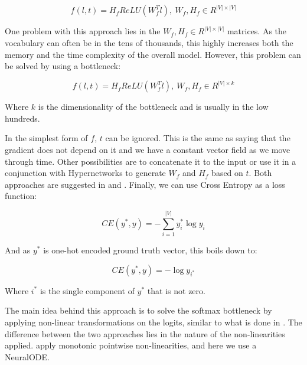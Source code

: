 \begin{displaymath}
    f(l, t) = H_f ReLU(W_f^T l), \ W_f, H_f \in R^{|V| \times |V|}    
\end{displaymath}

One problem with this approach lies in the $ W_f, H_f \in R^{ |V| \times |V| } $ matrices. As the vocabulary can often be in the tens of thousands, this highly increases both the memory and the time complexity of the overall model. However, this problem can be solved by using a bottleneck:

\begin{displaymath}
    f(l, t) = H_f ReLU(W_f^T l), \ W_f, H_f \in R^{|V| \times k}    
\end{displaymath}

Where $ k $ is the dimensionality of the bottleneck and is usually in the low hundreds.

In the simplest form of $ f $, $ t $ can be ignored. This is the same as saying that the gradient does not depend on it and we have a constant vector field as we move through time. Other possibilities are to concatenate it to the input or use it in a conjunction with Hypernetworks \citep{ha2016hypernetworks} to generate $ W_f $ and $ H_f $ based on $ t $. Both approaches are suggested in \citet{chen2018neural} and \citet{grathwohl2018ffjord}. Finally, we can use Cross Entropy as a loss function:

\begin{displaymath}
    CE(y^*, y) = - \sum_{i=1}^{|V|} y^*_i \log y_i
\end{displaymath}

And as $ y^* $ is one-hot encoded ground truth vector, this boils down to:

\begin{displaymath}
    CE(y^*, y) = - \log y_{i^*}
\end{displaymath}

Where $ i^* $ is the single component of $ y^* $ that is not zero.

The main idea behind this approach is to solve the softmax bottleneck by applying non-linear transformations on the logits, similar to what is done in \citep{ganea2019breaking}. The difference between the two approaches lies in the nature of the non-linearities applied. \citet{ganea2019breaking} apply monotonic pointwise non-linearities, and here we use a NeuralODE.
